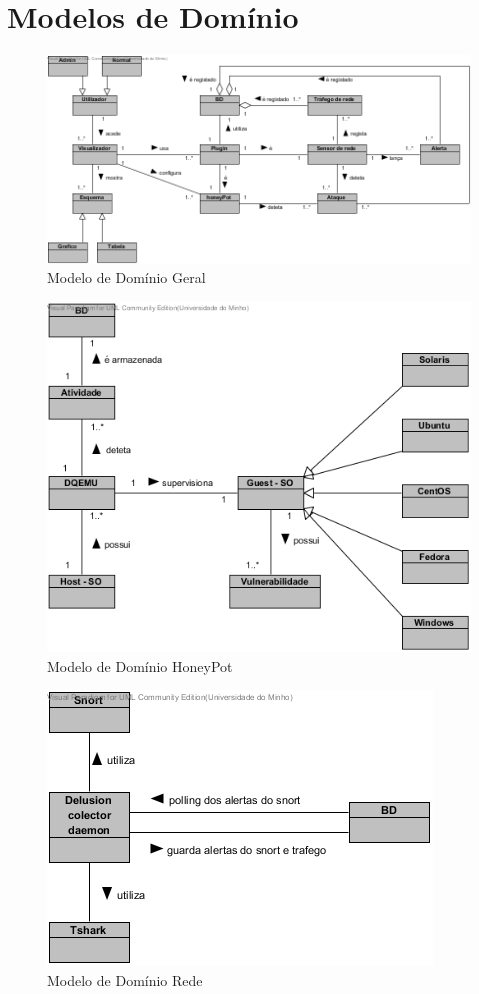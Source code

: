 \section{Modelos de Domínio}

\begin{figure}
	\centering	
	\includegraphics[scale=0.7]{images/ModelosDeDominio/Geral.png}
	\caption{Modelo de Domínio Geral}
\end{figure}

\begin{figure}
	\centering	
	\includegraphics[scale=0.8]{images/ModelosDeDominio/HoneyPot.png}
	\caption{Modelo de Domínio HoneyPot}
\end{figure}


\begin{figure}
	\centering	
	\includegraphics[scale=0.8]{images/ModelosDeDominio/Rede.png}
	\caption{Modelo de Domínio Rede}
\end{figure}

